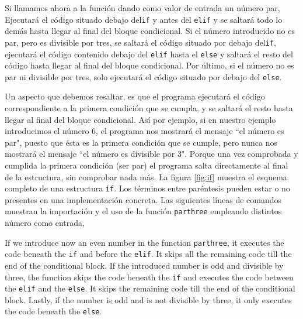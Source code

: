 \begin{paracol}{2}
Si llamamos ahora a la función dando como valor de entrada un número par, Ejecutará el código situado debajo del\texttt{if} y antes del \texttt{elif} y se saltará todo lo demás hasta llegar al final del bloque condicional. Si el número introducido no es par, pero es divisible por tres, se saltará el código situado por debajo del\texttt{if}, ejecutará el código contenido debajo del \texttt{elif} hasta el \texttt{else} y saltará el resto del código hasta llegar al final del bloque condicional. Por último, si el número no es par ni divisible por tres, solo ejecutará el código situado por debajo del \texttt{else}.

Un aspecto que debemos resaltar, es que el programa ejecutará el código correspondiente a la primera condición que se cumpla, y se saltará el resto hasta llegar al final del bloque condicional. Así por ejemplo, si en nuestro ejemplo introducimos el número $6$, el programa nos mostrará el mensaje ``el número es par", puesto que ésta es la primera condición que se cumple, pero nunca nos mostrará el mensaje ``el número es divisible por 3". Porque una vez comprobada y cumplida la primera condición (ser par) el programa salta directamente al final de la estructura, sin comprobar nada más. La figura \ref{fig:if} muestra el esquema completo de una estructura \texttt{if}. Los términos entre paréntesis pueden estar o no presentes en una implementación concreta. Las siguientes líneas de comandos muestran la importación y el uso de la función \texttt{parthree} empleando distintos número como entrada,

\switchcolumn
If we introduce now an even number in the function \texttt{parthree}, it executes the code beneath the \texttt{if} and before the \texttt{elif}. It skips all the remaining code till the end of the conditional block. If the introduced number is odd and divisible by three, the function skips the code beneath the \texttt{if} and executes the code between the \texttt{elif} and the \texttt{else}. It skips the remaining code till the end of the conditional block. Lastly, if the number is odd and is not divisible by three, it only executes the code beneath the \texttt{else}.


\end{paracol}

